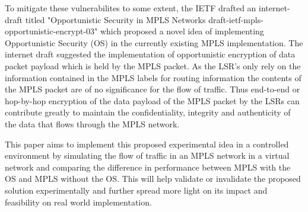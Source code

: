 \documentclass[a4paper, 12pt, oneside]{report}         %
\begin{document}
\begin{thesissummary}
    To mitigate these vulnerabilites to some extent, the IETF drafted an internet-draft titled "Opportunistic Security in MPLS Networks draft-ietf-mpls-opportunistic-encrypt-03" which proposed a novel idea of implementing Opportunistic Security (OS) in the currently existing MPLS implementation. The internet draft suggested the implementation of opportunistic encryption of data packet payload which is held by the MPLS packet. As the LSR's only rely on the information contained in the MPLS labels for routing information the contents of the MPLS packet are of no significance for the flow of traffic. Thus end-to-end or hop-by-hop encryption of the data payload of the MPLS packet by the LSRs can contribute greatly to maintain the confidentiality, integrity and authenticity of the data that flows through the MPLS network.
    
    This paper aims to implement this proposed experimental idea in a controlled environment by simulating the flow of traffic in an MPLS network in a virtual network and comparing the difference in performance between MPLS with the OS and MPLS without the OS. This will help validate or invalidate the proposed solution experimentally and further spread more light on its impact and feasibility on real world implementation. 
\end{thesissummary}


\tableofcontents                                  %
\listoftables                                     %
\listoffigures                                    %

  
  
%   
%   
%   

\begin{thebibliography}{ieeetr}                   %
\end{thebibliography}                             %


\begin{appendix}
 
% 
\end{appendix}


\end{document}
